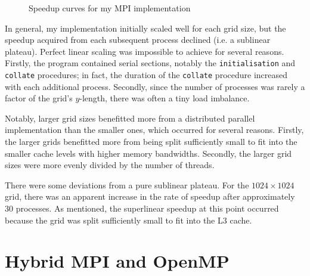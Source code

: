\documentclass[twocolumn, a4paper]{article}
\begin{document}
\begin{figure}[htpb]
{
  }
  \caption{Speedup curves for my MPI implementation}\label{fig:scaling}
\end{figure}

In general, my implementation initially scaled well for each grid size, but the speedup acquired from each subsequent process declined (i.e. a sublinear plateau).
Perfect linear scaling was impossible to achieve for several reasons.
Firstly, the program contained serial sections, notably the \texttt{initialisation} and \texttt{collate} procedures; in fact, the duration of the \texttt{collate} procedure increased with each additional process.
Secondly, since the number of processes was rarely a factor of the grid's $y$-length, there was often a tiny load imbalance.

Notably, larger grid sizes benefitted more from a distributed parallel implementation than the smaller ones, which occurred for several reasons.
Firstly, the larger grids benefitted more from being split sufficiently small to fit into the smaller cache levels with higher memory bandwidths.
Secondly, the larger grid sizes were more evenly divided by the number of threads.

There were some deviations from a pure sublinear plateau.
For the $1024\times1024$ grid, there was an apparent increase in the rate of speedup after approximately 30 processes.
As mentioned, the superlinear speedup at this point occurred because the grid was split sufficiently small to fit into the L3 cache.

\section{Hybrid MPI and OpenMP}
\end{document}
